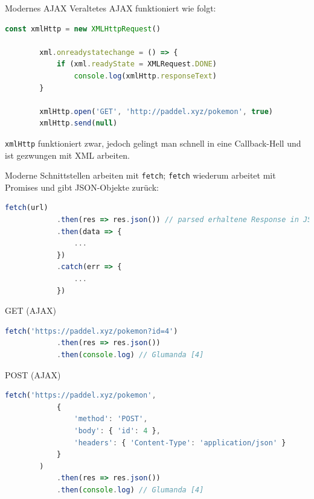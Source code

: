 \begin{bonus}{Modernes AJAX}
    Veraltetes AJAX funktioniert wie folgt:
    \begin{lstlisting}[language=JavaScript]
        const xmlHttp = new XMLHttpRequest()

        xml.onreadystatechange = () => {
            if (xml.readyState = XMLRequest.DONE)
                console.log(xmlHttp.responseText)
        }

        xmlHttp.open('GET', 'http://paddel.xyz/pokemon', true)
        xmlHttp.send(null)
    \end{lstlisting}

    \texttt{xmlHttp} funktioniert zwar, jedoch gelingt man schnell in eine Callback-Hell und ist gezwungen mit XML arbeiten.

    Moderne Schnittstellen arbeiten mit \texttt{fetch}; \texttt{fetch} wiederum arbeitet mit Promises und gibt JSON-Objekte zurück:
    \begin{lstlisting}[language=JavaScript]
        fetch(url)
            .then(res => res.json()) // parsed erhaltene Response in JSON
            .then(data => {
                ...
            })
            .catch(err => {
                ...
            })
    \end{lstlisting}
\end{bonus}

\begin{example}{GET (AJAX)}
    \begin{lstlisting}[language=JavaScript]
        fetch('https://paddel.xyz/pokemon?id=4')
            .then(res => res.json())
            .then(console.log) // Glumanda [4]
    \end{lstlisting}
\end{example}

\begin{example}{POST (AJAX)}
    \begin{lstlisting}[language=JavaScript]
        fetch('https://paddel.xyz/pokemon',
            {
                'method': 'POST',
                'body': { 'id': 4 },
                'headers': { 'Content-Type': 'application/json' }
            }
        )
            .then(res => res.json())
            .then(console.log) // Glumanda [4]
    \end{lstlisting}
\end{example}